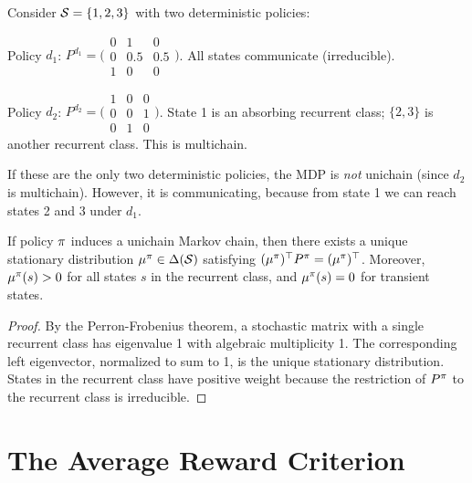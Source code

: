 \documentclass[11pt,a4paper]{article}
\begin{document}
\begin{example}
\label{ex:chain-types}
Consider $\mathcal{S} = \{1, 2, 3\}$ with two deterministic policies:

Policy $d_1$: $P^{d_1} = \bigl(\begin{smallmatrix}
0 & 1 & 0 \\ 0 & 0.5 & 0.5 \\ 1 & 0 & 0
\end{smallmatrix}\bigr)$. All states communicate (irreducible).

Policy $d_2$: $P^{d_2} = \bigl(\begin{smallmatrix}
1 & 0 & 0 \\ 0 & 0 & 1 \\ 0 & 1 & 0
\end{smallmatrix}\bigr)$. State 1 is an absorbing recurrent class;
$\{2, 3\}$ is another recurrent class. This is multichain.

If these are the only two deterministic policies, the MDP is
\emph{not} unichain (since $d_2$ is multichain). However, it is
communicating, because from state 1 we can reach states 2 and 3
under $d_1$.
\end{example}

\begin{proposition}
\label{prop:stationary-dist}
If policy $\pi$ induces a unichain Markov chain, then there
exists a unique stationary distribution
$\mu^\pi \in \Delta(\mathcal{S})$ satisfying
$(\mu^\pi)^\top P^\pi = (\mu^\pi)^\top$. Moreover,
$\mu^\pi(s) > 0$ for all states $s$ in the recurrent class,
and $\mu^\pi(s) = 0$ for transient states.
\end{proposition}

\begin{proof}
By the Perron-Frobenius theorem, a stochastic matrix with a single
recurrent class has eigenvalue 1 with algebraic multiplicity 1. The
corresponding left eigenvector, normalized to sum to 1, is the
unique stationary distribution. States in the recurrent class have
positive weight because the restriction of $P^\pi$ to the
recurrent class is irreducible.
\end{proof}


\section{The Average Reward Criterion}
\label{sec:average-reward}
\end{document}
